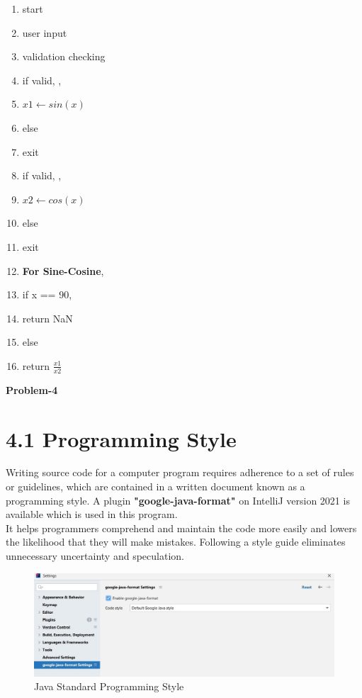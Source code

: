 \documentclass[12pt]{article}
\begin{document}
\begin{enumerate}
    \item start
    \item \indent user input
    \item validation checking
    \item if valid, 
    ,
    \item \hspace{10mm}$x1 \leftarrow sin(x)$
    \item else
    \item \hspace{10mm} exit
    \item if valid, 
    ,
    \item \hspace{10mm} $x2 \leftarrow cos(x)$
    \item else
    \item \hspace{10mm} exit
    \item \textbf{For Sine-Cosine},
    \item if x == 90,
    \item \hspace{10mm} return NaN
    \item else
    \item \hspace{10mm} return $ \frac{x1}{x2}$
\end{enumerate}


\newpage
\noindent
\Large\textbf{Problem-4}
\section*{4.1 Programming Style \cite{monash_link}\cite{medium_link}}
Writing source code for a computer program requires adherence to a set of rules or guidelines, which are contained in a written document known as a programming style. A plugin \textbf{"google-java-format"} on IntelliJ version 2021 is available which is used in this program.\\
It helps programmers comprehend and maintain the code more easily and lowers the likelihood that they will make mistakes. Following a style guide eliminates unnecessary uncertainty and speculation.
\begin{figure}[h!]
\centering
            \includegraphics[width=12cm]{prog_style.png}
                \caption{Java Standard Programming Style}
        \end{figure}
\end{document}
